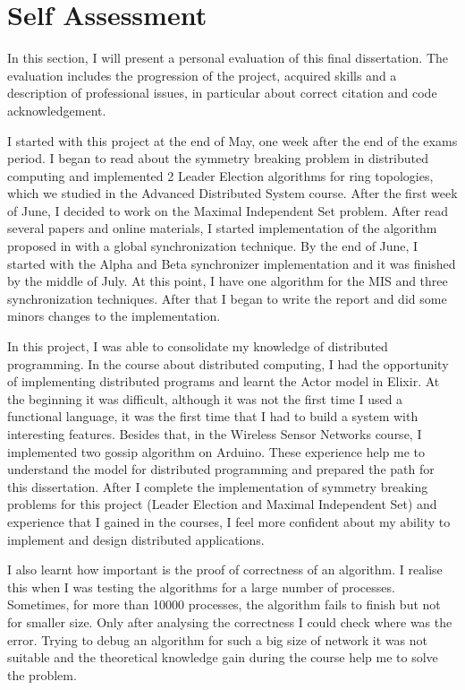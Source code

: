\section{Self Assessment}
\label{chap:7}


In this section, I will present a personal evaluation of this final dissertation.  The evaluation includes the progression of the project, acquired skills and a description of professional issues, in particular about correct citation and code acknowledgement. 

I started with this project at the end of May, one week after the end of the exams period. I began to read about the symmetry breaking problem in distributed computing and implemented 2 Leader Election algorithms for ring topologies, which we studied in the Advanced Distributed System course. After the first week of June, I decided to work on the Maximal Independent Set problem. After read several papers and online materials, I started implementation of the algorithm proposed in \cite{} with a global synchronization technique. By the end of June, I started with the Alpha and Beta synchronizer implementation and it was finished by the middle of July. At this point, I have one algorithm for the MIS and three synchronization techniques. After that I began to write the report and did some minors changes to the implementation.

In this project, I was able to consolidate my knowledge of distributed programming. In the course about distributed computing, I had the opportunity of implementing distributed programs and learnt the Actor model in Elixir. At the beginning it was difficult, although it was not the first time I used a functional language, it was the first time that I had to build a system with interesting features. Besides that, in the Wireless Sensor Networks course, I implemented two gossip algorithm on Arduino. These experience help me to understand the model for distributed programming and prepared the path for this dissertation. After I complete the implementation of symmetry breaking problems for this project (Leader Election and Maximal Independent Set)  and experience that I gained in the courses, I feel more confident about my ability to implement and design distributed applications.  

I also learnt how important is the proof of correctness of an algorithm. I realise this when I was testing the algorithms for a large number of processes. Sometimes, for more than 10000 processes, the algorithm fails to finish but not for smaller size. Only after analysing the correctness I could check where was the error. Trying to debug an algorithm for such a big size of network it was not suitable and the theoretical knowledge gain during the course help me to solve the problem. 


